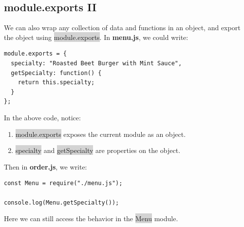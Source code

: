 \documentclass[11pt]{article}
\begin{document}
\subsection{module.exports II}
We can also wrap any collection of data and functions in an object, and export the object using \colorbox{lightgray}{module.exports}. In \textbf{menu.js}, we could write:
\begin{lstlisting}
module.exports = {
  specialty: "Roasted Beet Burger with Mint Sauce",
  getSpecialty: function() {
    return this.specialty;
  } 
}; 
\end{lstlisting}
In the above code, notice:
\begin{enumerate}[leftmargin = *]
\item \colorbox{lightgray}{module.exports} exposes the current module as an object.
\item \colorbox{lightgray}{specialty} and \colorbox{lightgray}{getSpecialty} are properties on the object.
\end{enumerate}
Then in \textbf{order.js}, we write:
\begin{lstlisting}
const Menu = require("./menu.js");

console.log(Menu.getSpecialty());
\end{lstlisting}
Here we can still access the behavior in the \colorbox{lightgray}{Menu} module.
\end{document}
